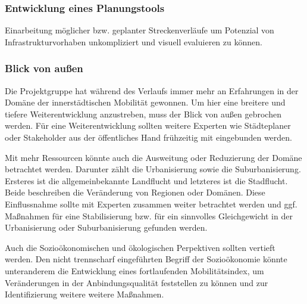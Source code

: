 



\subsubsection{Entwicklung eines Planungstools}
Einarbeitung möglicher bzw. geplanter Streckenverläufe um Potenzial von Infrastrukturvorhaben unkompliziert und visuell evaluieren zu können.


\subsubsection{Blick von außen}
Die Projektgruppe hat während des Verlaufs immer mehr an Erfahrungen in der Domäne der innerstädtischen Mobilität gewonnen. Um hier eine breitere und tiefere Weiterentwicklung anzustreben, muss der Blick von außen gebrochen werden.
Für eine Weiterentwicklung sollten weitere Experten wie Städteplaner oder Stakeholder aus der öffentliches Hand frühzeitig mit eingebunden werden.

Mit mehr Ressourcen könnte auch die Ausweitung oder Reduzierung der Domäne betrachtet werden. Darunter zählt die Urbanisierung sowie die Suburbanisierung.
Ersteres ist die allgemeinbekannte Landflucht und letzteres ist die Stadflucht. Beide beschreiben die Veränderung von Regionen oder Domänen. 
Diese Einflussnahme sollte mit Experten zusammen weiter betrachtet werden und ggf. Maßnahmen für eine Stabilisierung bzw. für ein sinnvolles Gleichgewicht in der Urbanisierung oder Suburbanisierung gefunden werden.

Auch die Sozioökonomischen und ökologischen Perpektiven sollten vertieft werden. 
Den nicht trennscharf eingeführten Begriff der Sozioökonomie könnte unteranderem die Entwicklung eines fortlaufenden Mobilitätsindex, um Veränderungen in der Anbindungsqualität feststellen zu können und zur Identifizierung weitere weitere Maßnahmen.


